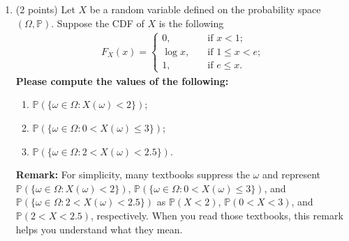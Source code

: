 \documentclass[11pt]{article}
\begin{document}
\begin{enumerate}
\item (2 points) Let $X$ be a random variable defined on the probability space $(\Omega,\mathbb{P})$. Suppose the CDF of $X$ is the following
\begin{align*}
    F_X(x)=\left\{
    \begin{aligned}
    0,\ \ \ &\text{ if }x<1;\\
    \log x,\ \ \ &\text{ if }1\le x<e;\\
    1,\ \ \ &\text{ if }e\le x.
    \end{aligned}
    \right.
\end{align*}
\textbf{Please compute the values of the following:}
\begin{enumerate}
    \item $\mathbb{P}(\{\omega\in\Omega: X(\omega)<2\})$;
    \item $\mathbb{P}(\{\omega\in\Omega: 0<X(\omega)\le3\})$;
    \item $\mathbb{P}(\{\omega\in\Omega: 2<X(\omega)<2.5\})$.
\end{enumerate}
\textbf{Remark:} For simplicity, many textbooks suppress the $\omega$ and represent  $\mathbb{P}(\{\omega\in\Omega: X(\omega)<2\})$, $\mathbb{P}(\{\omega\in\Omega: 0<X(\omega)\le3\})$, and $\mathbb{P}(\{\omega\in\Omega: 2<X(\omega)<2.5\})$ as $\mathbb{P}(X<2)$, $\mathbb{P}(0<X<3)$, and $\mathbb{P}(2<X<2.5)$, respectively. When you read those textbooks, this remark helps you understand what they mean.

\end{enumerate}


\newpage
\end{document}
